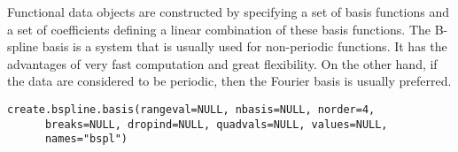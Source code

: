 \begin{Description}\relax
Functional data objects are constructed by specifying a set of basis 
functions and a set of coefficients defining a linear combination of
these basis functions.  The B-spline basis is a system that is usually
used for non-periodic functions.  It has the advantages of very fast
computation and great flexibility.  On the other hand, if the data are
considered to be periodic, then the Fourier basis is usually
preferred.
\end{Description}
\begin{Usage}
\begin{verbatim}
create.bspline.basis(rangeval=NULL, nbasis=NULL, norder=4,
      breaks=NULL, dropind=NULL, quadvals=NULL, values=NULL,
      names="bspl") 
\end{verbatim}
\end{Usage}
